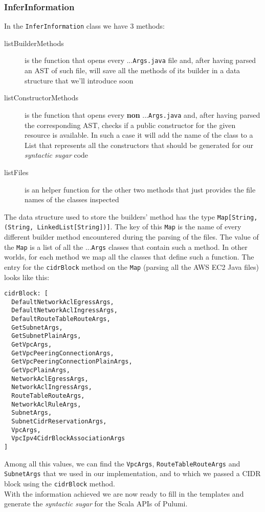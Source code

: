 \subsubsection{InferInformation}
In the \texttt{InferInformation} class we have 3 methods:
\begin{description}
  \item[listBuilderMethods] is the function that opens every ...\texttt{Args.java} file and, after having parsed an AST of such file, will save all the methods of its builder in a data structure that we'll introduce soon
  \item[listConstructorMethods] is the function that opens every \textbf{non} ...\texttt{Args.java} and, after having parsed the corresponding AST, checks if a public constructor for the given resource is available. In such a case it will add the name of the class to a List that represents all the constructors that should be generated for our \textit{syntactic sugar} code
  \item[listFiles] is an helper function for the other two methods that just provides the file names of the classes inspected
\end{description}
The data structure used to store the builders' method has the type \texttt{Map[String, (String, LinkedList[String])]}.
The key of this \texttt{Map} is the name of every different builder method encountered during the parsing of the files.
The value of the \texttt{Map} is a list of all the ...\texttt{Args} classes that contain such a method.
In other worlds, for each method we map all the classes that define such a function.
The entry for the \texttt{cidrBlock} method on the \texttt{Map} (parsing all the AWS EC2 Java files) looks like this:
\begin{verbatim}
cidrBlock: [
  DefaultNetworkAclEgressArgs,
  DefaultNetworkAclIngressArgs,
  DefaultRouteTableRouteArgs,
  GetSubnetArgs,
  GetSubnetPlainArgs,
  GetVpcArgs,
  GetVpcPeeringConnectionArgs,
  GetVpcPeeringConnectionPlainArgs,
  GetVpcPlainArgs,
  NetworkAclEgressArgs,
  NetworkAclIngressArgs,
  RouteTableRouteArgs,
  NetworkAclRuleArgs,
  SubnetArgs,
  SubnetCidrReservationArgs,
  VpcArgs,
  VpcIpv4CidrBlockAssociationArgs
]
\end{verbatim}
Among all this values, we can find the \texttt{VpcArgs}, \texttt{RouteTableRouteArgs} and \texttt{SubnetArgs} that we used in our implementation, and to which we passed a CIDR block using the \texttt{cidrBlock} method.\\
With the information achieved we are now ready to fill in the templates and generate the \textit{syntactic sugar} for the Scala APIs of Pulumi.

